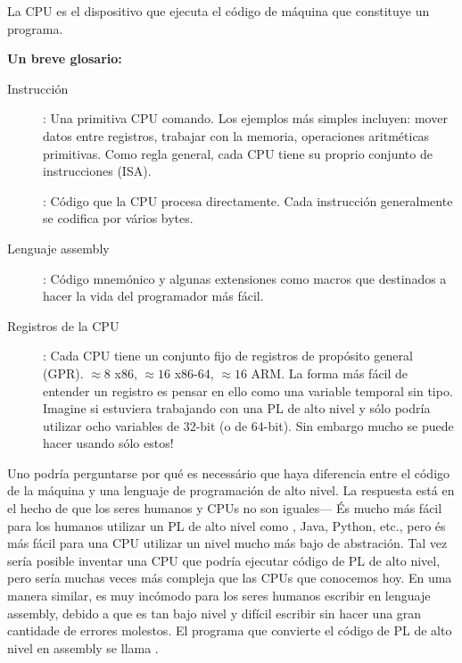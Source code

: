 
La \ac{CPU} es el dispositivo que ejecuta el código de máquina que constituye un programa.

\textbf{Un breve glosario:}

\begin{description}
\item[Instrucción]: Una primitiva \ac{CPU} comando.
Los ejemplos más simples incluyen: mover datos entre registros, trabajar con la memoria, operaciones aritméticas primitivas.
Como regla general, cada \ac{CPU} tiene su proprio conjunto de instrucciones (\ac{ISA}).

\item[\ESph{}]: Código que la \ac{CPU} procesa directamente. 
Cada instrucción generalmente se codifica por vários bytes.
\item[Lenguaje assembly]: Código mnemónico y algunas extensiones como macros que destinados a hacer la vida del programador más fácil.
\item[Registros de la CPU]: 
Cada \ac{CPU} tiene un conjunto fijo de registros de propósito general (\ac{GPR}).
$\approx 8$ \ESph{} x86, $\approx 16$ \ESph{} x86-64, $\approx 16$ \ESph{} ARM.
La forma más fácil de entender un registro es pensar en ello como una variable temporal sin tipo.
Imagine si estuviera trabajando con una \ac{PL} de alto nivel y sólo podría utilizar ocho variables de 32-bit (o de 64-bit).
Sin embargo mucho se puede hacer usando sólo estos!
\end{description}

Uno podría perguntarse por qué es necessário que haya diferencia entre el código de la máquina y una lenguaje de programación de alto nivel.  La respuesta está en el hecho de que los seres humanos y CPUs no son iguales---%
És mucho más fácil para los humanos utilizar un \ac{PL} de alto nivel como \CCpp, Java, Python, etc., pero és más fácil para una \ac{CPU} utilizar un nivel mucho más bajo de abstración.
Tal vez sería posible inventar una \ac{CPU} que podría ejecutar código de \ac{PL} de alto nivel, pero sería muchas veces más compleja que las \ac{CPU}s que conocemos hoy.
En uma manera similar, es muy incómodo para los seres humanos escribir en lenguaje assembly, debido a que es tan bajo nivel y difícil escribir sin hacer una gran cantidade de errores molestos.
El programa que convierte el código de \ac{PL} de alto nivel en assembly se llama .

%
%
%

